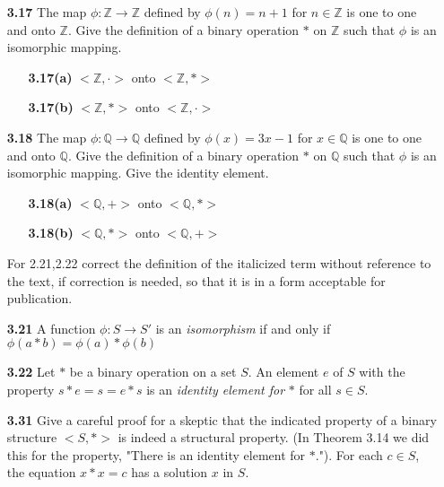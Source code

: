 \documentclass[11pt]{article}
\theoremstyle{plain}
\theoremstyle{definition}
\newcommand{\Q}{\mathbb{Q}}
\newcommand{\Z}{\mathbb{Z}}
\begin{document}
\begin{enumerate}
\begin{enumerate}
\begin{enumerate}
            \end{enumerate}
        
        \item[\textbf{3.17}] The map $\phi: \Z \rightarrow \Z$ defined by $\phi(n)=n+1$ for $n \in \Z$ is one to one and onto $\Z$. Give the definition of a binary operation $\ast$ on $\Z$ such that $\phi$ is an isomorphic mapping.
            \begin{enumerate}
                \item[\textbf{3.17(a)}]
                $<\Z,\cdot>$ onto $<\Z,\ast>$
                \item[\textbf{3.17(b)}]
                $<\Z,\ast>$ onto $<\Z,\cdot>$
            \end{enumerate}
        
        \item[\textbf{3.18}] The map $\phi: \Q \rightarrow \Q$ defined by $\phi(x)=3x-1$ for $x \in \Q$ is one to one and onto $\Q$. Give the definition of a binary operation $\ast$ on $\Q$ such that $\phi$ is an isomorphic mapping. Give the identity element.
            \begin{enumerate}
                \item[\textbf{3.18(a)}]
                $<\Q,+>$ onto $<\Q,\ast>$
                \item[\textbf{3.18(b)}]
                $<\Q,\ast>$ onto $<\Q,+>$
                
            \end{enumerate}
        
        
        For 2.21,2.22 correct the definition of the italicized term without  reference to the text, if correction is needed, so that it is in a form acceptable for publication.
        
        \item[\textbf{3.21}] A function $\phi:S \rightarrow S'$ is an \textit{isomorphism} if and only if $\phi(a\ast b) = \phi(a) \ast \phi(b)$
        
        \item[\textbf{3.22}] Let $\ast$ be a binary operation on a set $S$. An element $e$ of $S$ with the property $s \ast e = s = e  \ast s$ is an \textit{identity element for} $\ast$ for all $s \in S$.
        
        \item[\textbf{3.31}] Give a careful proof for a skeptic that the indicated property of a binary structure $<S,\ast>$ is indeed a structural property. (In Theorem 3.14 we did this for the property, "There is an identity element for $\ast$."). For each $c \in S$, the equation $x \ast x = c$ has a solution $x$ in $S$.
        

\end{enumerate}
\end{enumerate}
\end{document}
